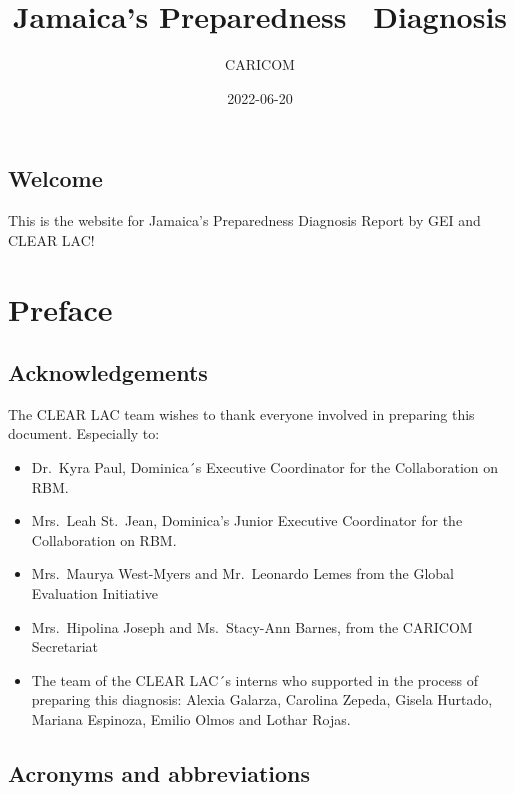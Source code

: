 \documentclass[
  10pt,
]{book}
\title{Jamaica's Preparedness ~Diagnosis}
\author{CARICOM}
\date{2022-06-20}
\begin{document}
\maketitle

{
\setcounter{tocdepth}{1}
\tableofcontents
}
\hypertarget{welcome}{%
\chapter*{Welcome}\label{welcome}}

This is the website for Jamaica's Preparedness Diagnosis Report by GEI and CLEAR LAC!

\hypertarget{part-preface}{%
\part{Preface}\label{part-preface}}

\hypertarget{acknowledgements}{%
\chapter*{Acknowledgements}\label{acknowledgements}}

The CLEAR LAC team wishes to thank everyone involved in preparing this document. Especially to:

\begin{itemize}
\item
  Dr.~Kyra Paul, Dominica´s Executive Coordinator for the Collaboration on RBM.
\item
  Mrs.~Leah St.~Jean, Dominica's Junior Executive Coordinator for the Collaboration on RBM.
\item
  Mrs.~Maurya West-Myers and Mr.~Leonardo Lemes from the Global Evaluation Initiative
\item
  Mrs.~Hipolina Joseph and Ms.~Stacy-Ann Barnes, from the CARICOM Secretariat
\item
  The team of the CLEAR LAC´s interns who supported in the process of preparing this diagnosis: Alexia Galarza, Carolina Zepeda, Gisela Hurtado, Mariana Espinoza, Emilio Olmos and Lothar Rojas.
\end{itemize}

\hypertarget{acronyms-and-abbreviations}{%
\chapter*{Acronyms and abbreviations}\label{acronyms-and-abbreviations}}
\end{document}
